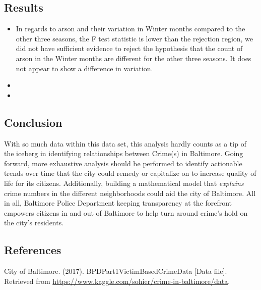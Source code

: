 \documentclass{article}
\newlength\tindent
\renewcommand{\indent}{\hspace*{\tindent}}
\begin{document}
\subsection{Results}
\indent 
\begin{itemize}
\item In regards to arson and their variation in Winter months compared to the other three seasons, the F test statistic is lower than the rejection region, we did not have sufficient evidence to reject the hypothesis that the count of arson in the Winter months are different for the other three seasons.  It does not appear to show a difference in variation.

\item 

\item   
\end{itemize}
 

\subsection*{Conclusion}
\indent With so much data within this data set, this analysis hardly counts as a tip of the iceberg in identifying relationships between Crime(s) in Baltimore.  Going forward, more exhaustive analysis should be performed to identify actionable trends over time that the city could remedy or capitalize on to increase quality of life for its citizens.  Additionally, building a mathematical model that \textit{explains} crime numbers in the different neighborhoods could aid the city of Baltimore.  All in all, Baltimore Police Department keeping transparency at the forefront empowers citizens in and out of Baltimore to help turn around crime's hold on the city's residents.  


\subsection*{References}
City of Baltimore. (2017). BPDPart1VictimBasedCrimeData [Data file].  Retrieved from \url{https://www.kaggle.com/sohier/crime-in-baltimore/data}.  


\end{document}
